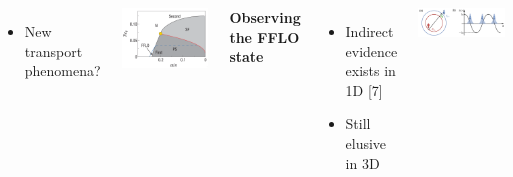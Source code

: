 \documentclass[26pt, paperwidth=36in,paperheight=48in]{tikzposter} %
\newcommand{\myfont}{\fontsize{26}{36}\selectfont}
\begin{document}
\begin{columns}
{\begin{minipage}{0.3\textwidth}
\begin{itemize}
			\item New transport phenomena?
		\end{itemize}		
	\end{minipage}
	\hspace{-4.0cm}
	\vspace{-1.0cm}
	\begin{minipage}{0.15\textwidth}
		\includegraphics[width=\textwidth]{figures_retreat/FFLO_phase_diagram.png}
	\end{minipage}	
	
	
	\vspace{2.0cm}
	\begin{minipage}{0.25\textwidth}
		\flushleft
		\vspace{0.5cm}
		\textbf{Observing the FFLO state}
		\vspace{0.5cm}
		\myfont
		\begin{minipage}{0.75\textwidth}
			\flushleft
			\vspace{1.0cm}
			\begin{itemize}				
				\item Indirect evidence exists in 1D [7]
				\item Still elusive in 3D
			\end{itemize}
		\end{minipage}
	\end{minipage}
	\hspace{-7.5cm}
	\vspace{1.0cm}
	\begin{minipage}{0.2\textwidth}
	\vspace{1.0cm}
		\includegraphics[width=1.25\textwidth]{figures_retreat/FFLO.png}
	\end{minipage}	
	\vspace{2.0cm}
	
}
\end{columns}
\end{document}

